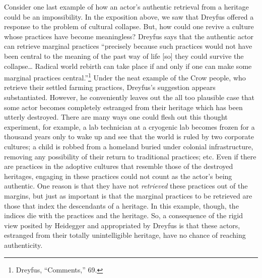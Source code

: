 Consider one last example of how an actor's authentic retrieval from a
heritage could be an impossibility. In the exposition above, we saw that
Dreyfus offered a response to the problem of cultural collapse. But, how
could one revive a culture whose practices have become meaningless?
Dreyfus says that the authentic actor can retrieve marginal practices
``precisely because such practices would not have been central to the
meaning of the past way of life {[}so{]} they could survive the
collapse\ldots{} Radical world rebirth can take place if and only if one
can make some marginal practices central.''\footnote{Dreyfus,
  ``Comments,'' 69.} Under the neat example of the Crow people, who
retrieve their settled farming practices, Dreyfus's suggestion appears
substantiated. However, he conveniently leaves out the all too plausible
case that some actor becomes completely estranged from their heritage
which has been utterly destroyed. There are many ways one could flesh
out this thought experiment, for example, a lab technician at a
cryogenic lab becomes frozen for a thousand years only to wake up and
see that the world is ruled by two corporate cultures; a child is robbed
from a homeland buried under colonial infrastructure, removing any
possibility of their return to traditional practices; etc. Even if there
are practices in the adoptive cultures that resemble those of the
destroyed heritages, engaging in these practices could not count as the
actor's being authentic. One reason is that they have not
\emph{retrieved} these practices out of the margins, but just as
important is that the marginal practices to be retrieved are those that
index the descendants of a heritage. In this example, though, the
indices die with the practices and the heritage. So, a consequence of
the rigid view posited by Heidegger and appropriated by Dreyfus is that
these actors, estranged from their totally unintelligible heritage, have
no chance of reaching authenticity.

